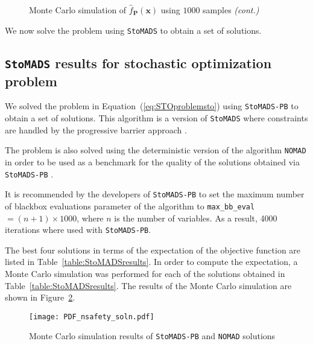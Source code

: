 \begin{figure}[h!]
	\ContinuedFloat %
	\caption[Monte Carlo simulation of $\hat{f}_{\mathbf{P}}(\mathbf{x})$ using $1000$ samples]{Monte Carlo simulation of $\hat{f}_{\mathbf{P}}(\mathbf{x})$ using $1000$ samples \emph{(cont.)}}
	\label{fig:MSCStoblackbox}
\end{figure}

We now solve the problem using \texttt{StoMADS} to obtain a set of solutions.

\subsection{\texttt{StoMADS} results for stochastic optimization problem} \label{subsec:STOMADSresults}

We solved the problem in Equation~(\ref{eq:STOproblemsto}) using \texttt{StoMADS-PB} to obtain a set of solutions. This algorithm is a version of \texttt{StoMADS} where constraints are handled by the progressive barrier approach \cite{Audet2009}.

The problem is also solved using the deterministic version of the algorithm \texttt{NOMAD} in order to be used as a benchmark for the quality of the solutions obtained via \texttt{StoMADS-PB} \cite{LeDigabel2011}. 

It is recommended by the developers of \texttt{StoMADS-PB} to set the maximum number of blackbox evaluations parameter of the algorithm to \texttt{max\_bb\_eval}$ = (n+1) \times 1000$, where $n$ is the number of variables. As a result, 4000 iterations where used with \texttt{StoMADS-PB}.

The best four solutions in terms of the expectation of the objective function are listed in Table~\ref{table:StoMADSresults}. In order to compute the expectation, a Monte Carlo simulation was performed for each of the solutions obtained in Table~\ref{table:StoMADSresults}. The results of the Monte Carlo simulation are shown in Figure~\ref{fig:MCSstomadsresults}.

\begin{figure}[h!]
	\centering
	\texttt{[image: PDF\_nsafety\_soln.pdf]}
	\caption{Monte Carlo simulation results of \texttt{StoMADS-PB} and \texttt{NOMAD} solutions}
	\label{fig:MCSstomadsresults}
\end{figure}

